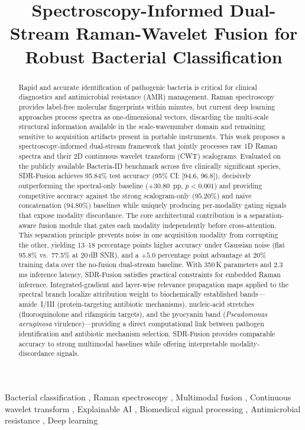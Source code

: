 \documentclass[preprint,12pt]{elsarticle}
\begin{document}
\begin{frontmatter}

\title{Spectroscopy-Informed Dual-Stream Raman-Wavelet Fusion for Robust Bacterial Classification}

\author{}
\address{}
\begin{abstract}
Rapid and accurate identification of pathogenic bacteria is critical
for clinical diagnostics and antimicrobial resistance (AMR) management.
Raman spectroscopy provides label-free molecular fingerprints within
minutes, but current deep learning approaches process spectra as
one-dimensional vectors, discarding the multi-scale structural
information available in the scale-wavenumber domain and remaining
sensitive to acquisition artifacts present in portable instruments.
This work proposes a spectroscopy-informed dual-stream framework that
jointly processes raw 1D Raman spectra
and their 2D continuous wavelet transform (CWT) scalograms.
Evaluated on the publicly available Bacteria-ID benchmark across
five clinically significant species, SDR-Fusion achieves 95.84\%
test accuracy (95\% CI: [94.6, 96.8]), decisively outperforming the
spectral-only baseline ($+30.80$~pp, $p<0.001$) and providing competitive
accuracy against the strong scalogram-only ($95.20\%$) and naive
concatenation ($94.80\%$) baselines while uniquely producing
per-modality gating signals that expose modality discordance. The core
architectural contribution is a separation-aware fusion module that
gates each modality independently before cross-attention. This
separation principle prevents noise in one acquisition modality from
corrupting the other, yielding 13--18 percentage points higher accuracy
under Gaussian noise (flat 95.8\% vs.\ 77.5\% at 20\,dB SNR), and a
$+5.0$ percentage point advantage at $20\%$ training data over the
no-fusion dual-stream baseline. With 350\,K parameters and 2.3\,ms inference
latency, SDR-Fusion satisfies practical constraints for embedded Raman
inference. Integrated-gradient and layer-wise relevance propagation maps applied
to the spectral branch localize attribution weight to biochemically
established bands---amide~I/III (protein-targeting antibiotic
mechanisms), nucleic-acid stretches (fluoroquinolone and rifampicin
targets), and the pyocyanin band (\textit{Pseudomonas aeruginosa}
virulence)---providing a direct computational link between pathogen
identification and antibiotic mechanism selection. SDR-Fusion provides comparable accuracy to strong multimodal baselines while offering interpretable modality-discordance signals.
\end{abstract}
\begin{keyword}
Bacterial classification \sep
Raman spectroscopy \sep
Multimodal fusion \sep
Continuous wavelet transform \sep
Explainable AI \sep
Biomedical signal processing \sep
Antimicrobial resistance \sep
Deep learning
\end{keyword}

\end{frontmatter}
\end{document}
